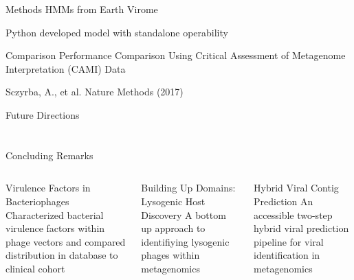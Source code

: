 \documentclass[11pt, xcolor=table]{beamer}
\begin{document}
  \begin{frame}{Methods}
  HMMs from Earth Virome
  
  Python developed model with standalone operability
  
  \end{frame}
  \begin{frame}{Comparison}
  Performance Comparison Using Critical Assessment of Metagenome Interpretation (CAMI) Data
  
  
  
  \tiny{Sczyrba, A., et al. Nature Methods (2017)}
	\end{frame}
	
	\begin{frame}{Future Directions}

	\end{frame}
\section{}
	
	\begin{frame}{Concluding Remarks}
	\begin{columns}
	\begin{block}{Virulence Factors in Bacteriophages}
	Characterized bacterial virulence factors within phage vectors and compared distribution in database to clinical cohort
	\end{block}
	\begin{block}{Building Up Domains: Lysogenic Host Discovery}
	A bottom up approach to identifiying lysogenic phages within metagenomics
	\end{block}
	\begin{block}{Hybrid Viral Contig Prediction}
	An accessible two-step hybrid viral prediction pipeline for viral identification in metagenomics
	\end{block}
	
	\end{columns}
	
	\end{frame}
	
	
\end{document}

